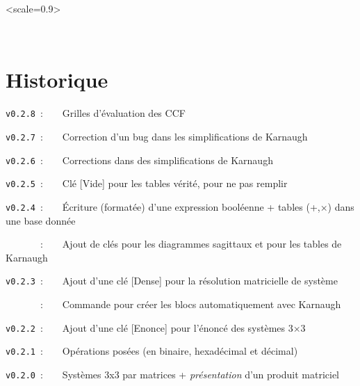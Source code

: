 \documentclass[french,a4paper,11pt]{article}
\providecommand\tikzlogo{Ti\textit{k}Z}
\providecommand\TeXLive{\TeX{}Live\xspace}
\let\TikZ\tikzlogo
\newcommand\TableauDocumentation{%
	\begin{tblr}{width=\linewidth,colspec={X[c]X[c]X[c]X[c]X[c]X[c]},cells={font=\large\sffamily}}
		{\LaTeX} & {\hologo{pdfLaTeX}} & {\hologo{LuaLaTeX}} & {\TikZ} & {\TeXLive} & {\hologo{MiKTeX}} \\
	\end{tblr}
}
\begin{document}
{{\vspace{0.5cm}

\hfill
\begin{GrapheTikz}[Unite=0.75cm,CouleurSommets={gray/blue},Epaisseur={very thick/thick},CouleurFleches=orange]<scale=0.9>
\end{GrapheTikz}
\hfill~
\hfill~


%
%
%
%
%

\newpage

\hypertarget{matoc}{}

\tableofcontents

\vfill

\newpage

\section{Historique}

\verb|v0.2.8|~:~~~~Grilles d'évaluation des CCF

\verb|v0.2.7|~:~~~~Correction d'un bug dans les simplifications de Karnaugh

\verb|v0.2.6|~:~~~~Corrections dans des simplifications de Karnaugh

\verb|v0.2.5|~:~~~~Clé \textsf{[Vide]} pour les tables vérité, pour ne pas remplir

\verb|v0.2.4|~:~~~~Écriture (formatée) d'une expression booléenne + tables (+,×) dans une base donnée

\verb|      |~:~~~~Ajout de clés pour les diagrammes sagittaux et pour les tables de Karnaugh

\verb|v0.2.3|~:~~~~Ajout d'une clé [Dense] pour la résolution matricielle de système

\verb|      |~:~~~~Commande pour créer les blocs automatiquement avec Karnaugh

\verb|v0.2.2|~:~~~~Ajout d'une clé \textsf{[Enonce]} pour l'énoncé des systèmes 3×3

\verb|v0.2.1|~:~~~~Opérations posées (en binaire, hexadécimal et décimal)

\verb|v0.2.0|~:~~~~Systèmes 3x3 par matrices + \textit{présentation} d'un produit matriciel

}}
\end{document}
